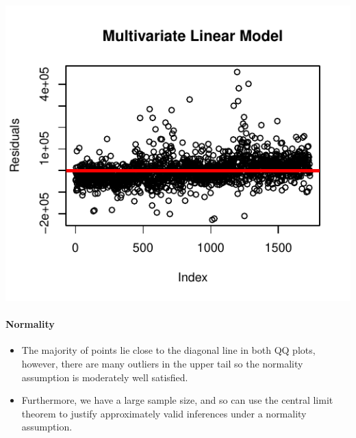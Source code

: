 \documentclass[letterpaper,9pt,twocolumn,twoside,]{pinp}
\providecommand{\tightlist}{%
  \setlength{\itemsep}{0pt}\setlength{\parskip}{0pt}}
\begin{document}
\begin{center}\includegraphics{Final-Report_files/figure-latex/unnamed-chunk-10-1} \end{center}

\hypertarget{normality}{%
\paragraph{Normality}\label{normality}}

\begin{itemize}
\tightlist
\item
  The majority of points lie close to the diagonal line in both QQ
  plots, however, there are many outliers in the upper tail so the
  normality assumption is moderately well satisfied.
\item
  Furthermore, we have a large sample size, and so can use the central
  limit theorem to justify approximately valid inferences under a
  normality assumption.
\end{itemize}
\end{document}
